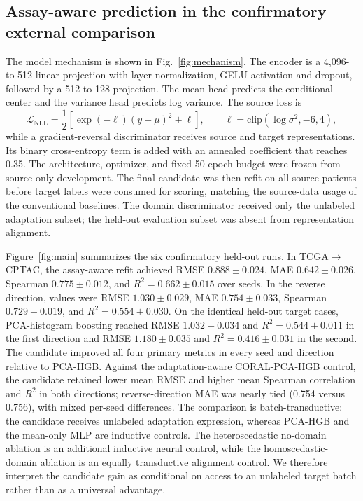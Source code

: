 \documentclass[11pt]{article}
\begin{document}
\subsection{Assay-aware prediction in the confirmatory external comparison}
The model mechanism is shown in Fig.~\ref{fig:mechanism}. The encoder is a 4,096-to-512 linear projection with layer normalization, GELU activation and dropout, followed by a 512-to-128 projection. The mean head predicts the conditional center and the variance head predicts log variance. The source loss is
\begin{equation}
\mathcal{L}_{\mathrm{NLL}}=\frac{1}{2}\left[\exp(-\ell)(y-\mu)^2+\ell\right],\qquad \ell=\mathrm{clip}(\log\sigma^2,-6,4),
\end{equation}
while a gradient-reversal discriminator receives source and target representations. Its binary cross-entropy term is added with an annealed coefficient that reaches 0.35. The architecture, optimizer, and fixed 50-epoch budget were frozen from source-only development. The final candidate was then refit on all source patients before target labels were consumed for scoring, matching the source-data usage of the conventional baselines. The domain discriminator received only the unlabeled adaptation subset; the held-out evaluation subset was absent from representation alignment.

Figure~\ref{fig:main} summarizes the six confirmatory held-out runs. In TCGA$\rightarrow$CPTAC, the assay-aware refit achieved RMSE $0.888\pm0.024$, MAE $0.642\pm0.026$, Spearman $0.775\pm0.012$, and $R^2=0.662\pm0.015$ over seeds. In the reverse direction, values were RMSE $1.030\pm0.029$, MAE $0.754\pm0.033$, Spearman $0.729\pm0.019$, and $R^2=0.554\pm0.030$. On the identical held-out target cases, PCA-histogram boosting reached RMSE $1.032\pm0.034$ and $R^2=0.544\pm0.011$ in the first direction and RMSE $1.180\pm0.035$ and $R^2=0.416\pm0.031$ in the second. The candidate improved all four primary metrics in every seed and direction relative to PCA-HGB. Against the adaptation-aware CORAL-PCA-HGB control, the candidate retained lower mean RMSE and higher mean Spearman correlation and $R^2$ in both directions; reverse-direction MAE was nearly tied (0.754 versus 0.756), with mixed per-seed differences. The comparison is batch-transductive: the candidate receives unlabeled adaptation expression, whereas PCA-HGB and the mean-only MLP are inductive controls. The heteroscedastic no-domain ablation is an additional inductive neural control, while the homoscedastic-domain ablation is an equally transductive alignment control. We therefore interpret the candidate gain as conditional on access to an unlabeled target batch rather than as a universal advantage.
\end{document}
